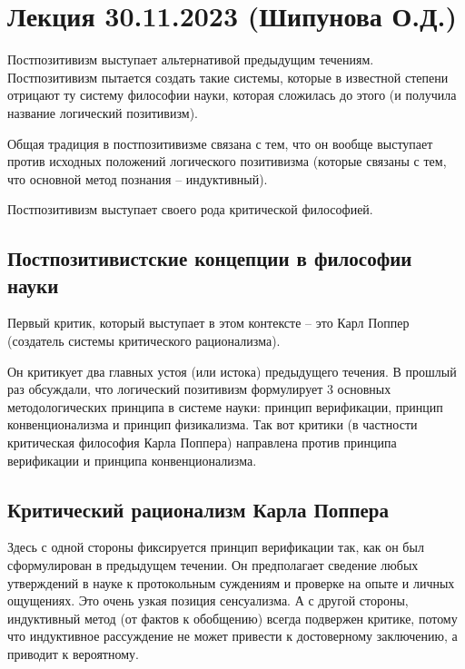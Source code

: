 \documentclass[main.tex]{subfiles}
\begin{document}
\section{Лекция 30.11.2023 (Шипунова О.Д.)}


Постпозитивизм выступает альтернативой предыдущим течениям.
Постпозитивизм пытается создать такие системы, которые в известной степени отрицают ту систему философии науки, которая сложилась до этого (и получила название логический позитивизм).

Общая традиция в постпозитивизме связана с тем, что он вообще выступает против исходных положений логического позитивизма (которые связаны с тем, что основной метод познания -- индуктивный).

Постпозитивизм выступает своего рода критической философией.

\subsection{Постпозитивистские концепции в философии науки}


Первый критик, который выступает в этом контексте -- это Карл Поппер (создатель системы критического рационализма).

Он критикует два главных устоя (или истока) предыдущего течения.
В прошлый раз обсуждали, что логический позитивизм формулирует 3 основных методологических принципа в системе науки: принцип верификации, принцип конвенционализма и принцип физикализма.
Так вот критики (в частности критическая философия Карла Поппера) направлена против принципа верификации и принципа конвенционализма.

\subsection{Критический рационализм Карла Поппера}


Здесь с одной стороны фиксируется принцип верификации так, как он был сформулирован в предыдущем течении.
Он предполагает сведение любых утверждений в науке к протокольным суждениям и проверке на опыте и личных ощущениях.
Это очень узкая позиция сенсуализма.
А с другой стороны, индуктивный метод (от фактов к обобщению) всегда подвержен критике, потому что индуктивное рассуждение не может привести к достоверному заключению, а приводит к вероятному.
\end{document}
